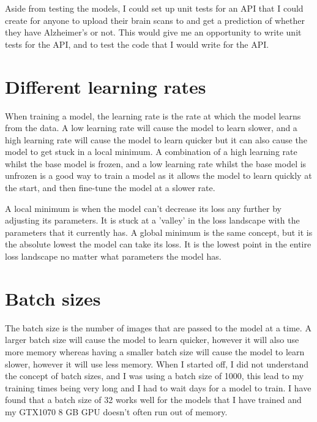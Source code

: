 \documentclass[]{final_report}
\begin{document}
Aside from testing the models, I could set up unit tests for an API that I could create for anyone to upload their brain scans to and get a prediction of whether they have Alzheimer's or not.
This would give me an opportunity to write unit tests for the API, and to test the code that I would write for the API.

\section{Different learning rates}

When training a model, the learning rate is the rate at which the model learns from the data.
A low learning rate will cause the model to learn slower, and a high learning rate will cause the model to learn quicker
but it can also cause the model to get stuck in a local minimum. A combination of a high learning rate whilst the base model is frozen,
and a low learning rate whilst the base model is unfrozen is a good way to train a model as it allows the model to learn quickly at the start,
and then fine-tune the model at a slower rate. 

A local minimum is when the model can't decrease its loss any further by adjusting its parameters. 
It is stuck at a 'valley' in the loss landscape with the parameters that it currently has.
A global minimum is the same concept, but it is the absolute lowest the model can take its loss.
It is the lowest point in the entire loss landscape no matter what parameters the model has.


\section{Batch sizes}

The batch size is the number of images that are passed to the model at a time.
A larger batch size will cause the model to learn quicker, however it will also use more memory whereas
having a smaller batch size will cause the model to learn slower, however it will use less memory.
When I started off, I did not understand the concept of batch sizes, and I was using a batch size of 1000, this lead to my training times
being very long and I had to wait days for a model to train.
I have found that a batch size of 32 works well for the models that I have trained and my GTX1070 8 GB GPU\cite{GTX1070} doesn't often run out of memory.
\end{document}
